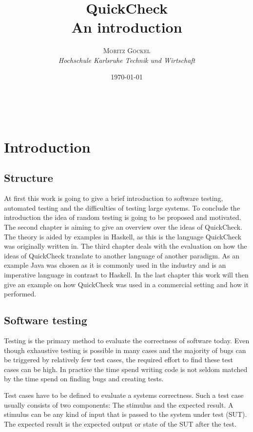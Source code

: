 \documentclass[a4paper, 12pt]{article} %
\title{\textbf{QuickCheck}\\ %
An introduction} %
\author{\textsc{Moritz G\"ockel} %
\\{\textit{Hochschule Karlsruhe Technik und Wirtschaft}}} %
\date{\today}
\makeatletter
\renewcommand{\maketitle}{ 
\begin{flushright} %
{\LARGE\@title} %

\vspace{50pt} %

{\large\@author}
\\\@date 

\vspace{40pt}
\end{flushright}
}
\makeatother
\begin{document}
\maketitle

\vspace{30pt}

\newpage
\tableofcontents

\newpage
\section{Introduction}

\subsection{Structure}

At first this work is going to give a brief introduction to software testing, automated testing and the difficulties of testing large systems. To conclude the introduction the idea of random testing is going to be proposed and motivated. The second chapter is aiming to give an overview over the ideas of QuickCheck. The theory is aided by examples in Haskell, as this is the language QuickCheck was originally written in. The third chapter deals with the evaluation on how the ideas of QuickCheck translate to another language of another paradigm. As an example Java was chosen as it is commonly used in the industry and is an imperative language in contrast to Haskell. In the last chapter this work will then give an example on how QuickCheck was used in a commercial setting and how it performed.

\subsection{Software testing}

Testing is the primary method to evaluate the correctness of software today\cite{Ammann2016}. Even though exhaustive testing is possible in many cases and the majority of bugs can be triggered by relatively few test cases\cite{Kuhn2004}, the required effort to find these test cases can be high. In practice the time spend writing code is not seldom matched by the time spend on finding bugs and creating tests.

Test cases have to be defined to evaluate a systems correctness. Such a test case usually consists of two components: The stimulus and the expected result. A stimulus can be any kind of input that is passed to the system under test (SUT). The expected result is the expected output or state of the SUT after the test.
\end{document}
